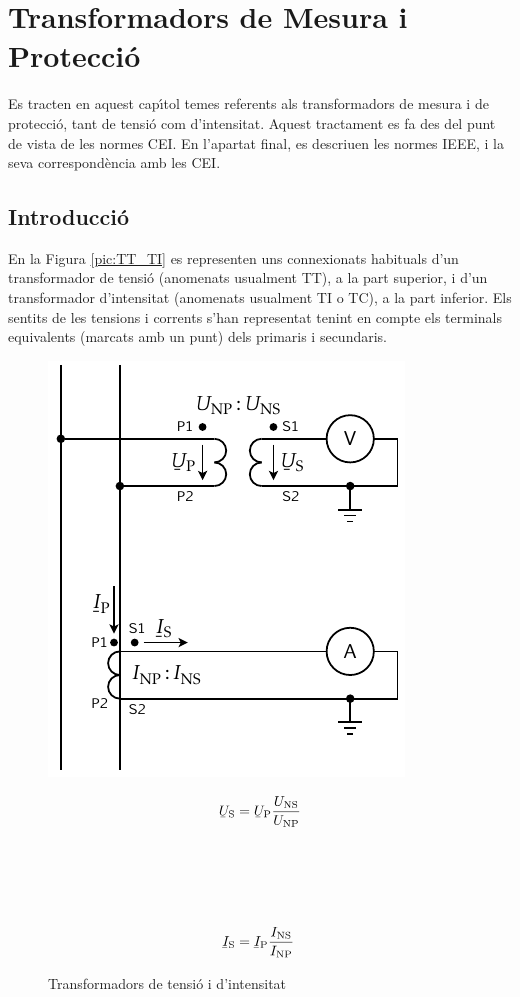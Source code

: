 \chapter{Transformadors de Mesura i Protecci\'{o}}

Es tracten en aquest cap\'{\i}tol temes referents als transformadors de
mesura i de protecci\'{o}, tant de tensi\'{o} com d'intensitat. Aquest
tractament es fa des del punt de vista de les normes \textsf{CEI}.
En l'apartat final, es descriuen les normes \textsf{IEEE}, i la seva
correspond\`{e}ncia amb les \textsf{\textsf{CEI}}.

\section{Introducci\'{o}}

En la Figura \vref{pic:TT_TI} es representen uns connexionats
habituals d'un transformador de tensi\'{o} (anomenats usualment TT), a
la part superior, i d'un transformador d'intensitat (anomenats
usualment TI o TC), a la part inferior. Els sentits de les tensions
i corrents s'han representat tenint en compte els terminals
equivalents (marcats amb un punt) dels primaris i secundaris.

\begin{figure}[h!]
\hfill
\begin{minipage}[b]{85mm}
\hspace{1.5cm}
    \includegraphics{Imatges/Cap-TrafosMesProt-TI-TT.pdf}
\caption{Transformadors de tensi\'{o} i d'intensitat} \label{pic:TT_TI}
\end{minipage}
\hfill
\begin{minipage}[b][75mm][t]{50mm}
   \begin{align}
      \cmplx{U}\ped{S} &= \cmplx{U}\ped{P} \frac{U\ped{NS}}{U\ped{NP}}
      \\[24mm]
      \cmplx{I}\ped{S} &= \cmplx{I}\ped{P} \frac{I\ped{NS}}{I\ped{NP}}
   \end{align}
\end{minipage}
\end{figure}

